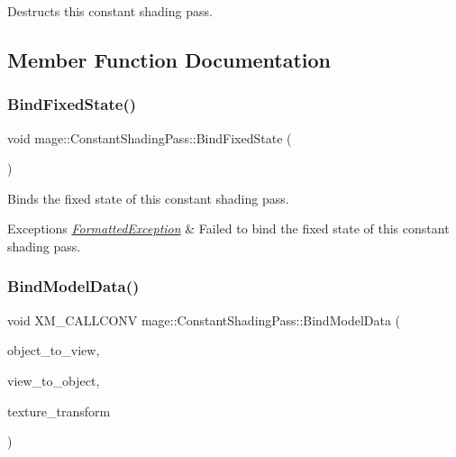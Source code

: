 Destructs this constant shading pass. 

\subsection{Member Function Documentation}
\hypertarget{classmage_1_1_constant_shading_pass_ab8d40634d0cd224c97ccb8dfbe43d45e}{}\label{classmage_1_1_constant_shading_pass_ab8d40634d0cd224c97ccb8dfbe43d45e} 
\subsubsection{\texorpdfstring{Bind\+Fixed\+State()}{BindFixedState()}}
{\footnotesize\ttfamily void mage\+::\+Constant\+Shading\+Pass\+::\+Bind\+Fixed\+State (\begin{DoxyParamCaption}{ }\end{DoxyParamCaption})}

Binds the fixed state of this constant shading pass.


\begin{DoxyExceptions}{Exceptions}
{\em \hyperlink{classmage_1_1_formatted_exception}{Formatted\+Exception}} & Failed to bind the fixed state of this constant shading pass. \\
\hline
\end{DoxyExceptions}
\hypertarget{classmage_1_1_constant_shading_pass_a512f1c4284e475e94502530bd37367b4}{}\label{classmage_1_1_constant_shading_pass_a512f1c4284e475e94502530bd37367b4} 
\subsubsection{\texorpdfstring{Bind\+Model\+Data()}{BindModelData()}}
{\footnotesize\ttfamily void X\+M\+\_\+\+C\+A\+L\+L\+C\+O\+NV mage\+::\+Constant\+Shading\+Pass\+::\+Bind\+Model\+Data (\begin{DoxyParamCaption}\item[{F\+X\+M\+M\+A\+T\+R\+IX}]{object\+\_\+to\+\_\+view,  }\item[{C\+X\+M\+M\+A\+T\+R\+IX}]{view\+\_\+to\+\_\+object,  }\item[{C\+X\+M\+M\+A\+T\+R\+IX}]{texture\+\_\+transform }\end{DoxyParamCaption})\hspace{0.3cm}{\ttfamily [private]}}

